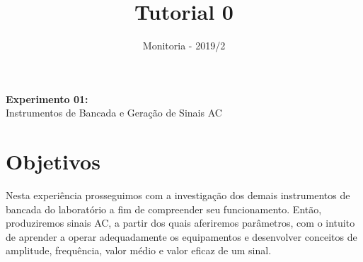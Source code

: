 \documentclass[10pt]{article}
\author{Monitoria - 2019/2}
\title{Tutorial 0}
\numberwithin{table}{section}
\numberwithin{figure}{section}
\begin{document}
\begin{center}
\vspace*{.03cm}
\Large\textbf{Experimento 01:}\\ %
\Large{Instrumentos de Bancada e Geração de Sinais AC}
\end{center}
\justify

\section{Objetivos}

Nesta experiência prosseguimos com a investigação dos demais instrumentos de bancada do laboratório a fim de compreender
seu funcionamento. Então, produziremos sinais AC, a partir dos quais aferiremos parâmetros, com o intuito de aprender a operar
adequadamente os equipamentos e desenvolver conceitos de amplitude, frequência, valor médio e valor eficaz de um sinal.




\end{document}
